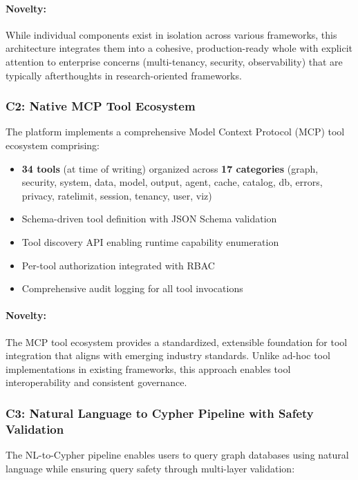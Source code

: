 \documentclass[a4paper,twoside]{sapthesis}
\newcommand{\ToolCount}{34}
\begin{document}
\paragraph{Novelty:} While individual components exist in isolation across various frameworks, this architecture integrates them into a cohesive, production-ready whole with explicit attention to enterprise concerns (multi-tenancy, security, observability) that are typically afterthoughts in research-oriented frameworks.

\subsubsection{C2: Native MCP Tool Ecosystem}

The platform implements a comprehensive Model Context Protocol (MCP) tool ecosystem comprising:

\begin{itemize}
    \item \textbf{\ToolCount{} tools} (at time of writing) organized across \textbf{17 categories} (graph, security, system, data, model, output, agent, cache, catalog, db, errors, privacy, ratelimit, session, tenancy, user, viz)
    \item Schema-driven tool definition with JSON Schema validation
    \item Tool discovery API enabling runtime capability enumeration
    \item Per-tool authorization integrated with RBAC
    \item Comprehensive audit logging for all tool invocations
\end{itemize}

\paragraph{Novelty:} The MCP tool ecosystem provides a standardized, extensible foundation for tool integration that aligns with emerging industry standards. Unlike ad-hoc tool implementations in existing frameworks, this approach enables tool interoperability and consistent governance.

\subsubsection{C3: Natural Language to Cypher Pipeline with Safety Validation}

The NL-to-Cypher pipeline enables users to query graph databases using natural language while ensuring query safety through multi-layer validation:
\end{document}

